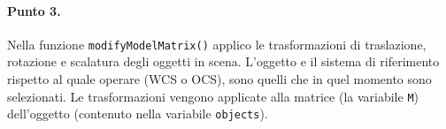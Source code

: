 \documentclass[a4paper, 12pt]{article}
\begin{document}
\paragraph{Punto 3.}
Nella funzione \texttt{modifyModelMatrix()} applico le trasformazioni di traslazione, rotazione e scalatura degli oggetti in scena. L'oggetto e il sistema di riferimento rispetto al quale operare (WCS o OCS), sono quelli che in quel momento sono selezionati. Le trasformazioni vengono applicate alla matrice (la variabile \texttt{M}) dell'oggetto (contenuto nella variabile \texttt{objects}).


\end{document}
